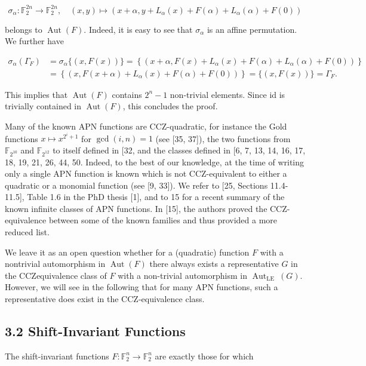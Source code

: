 \documentclass[10pt]{article}
\begin{document}
$$
\sigma_{\alpha}: \mathbb{F}_{2}^{2 n} \rightarrow \mathbb{F}_{2}^{2 n}, \quad(x, y) \mapsto\left(x+\alpha, y+L_{\alpha}(x)+F(\alpha)+L_{\alpha}(\alpha)+F(0)\right)
$$

belongs to $\operatorname{Aut}(F)$. Indeed, it is easy to see that $\sigma_{\alpha}$ is an affine permutation. We further have

$$
\begin{aligned}
\sigma_{\alpha}\left(\Gamma_{F}\right) & =\sigma_{\alpha}\{(x, F(x))\}=\left\{\left(x+\alpha, F(x)+L_{\alpha}(x)+F(\alpha)+L_{\alpha}(\alpha)+F(0)\right)\right\} \\
& =\left\{\left(x, F(x+\alpha)+L_{\alpha}(x)+F(\alpha)+F(0)\right)\right\}=\{(x, F(x))\}=\Gamma_{F} .
\end{aligned}
$$

This implies that $\operatorname{Aut}(F)$ contains $2^{n}-1$ non-trivial elements. Since id is trivially contained in $\operatorname{Aut}(F)$, this concludes the proof.

Many of the known APN functions are CCZ-quadratic, for instance the Gold functions $x \mapsto x^{2^{i}+1}$ for $\operatorname{gcd}(i, n)=1$ (see [35, 37]), the two functions from $\mathbb{F}_{2^{10}}$ and $\mathbb{F}_{2^{12}}$ to itself defined in [32, and the classes defined in [6, 7, 13, 14, 16, 17, 18, 19, 21, 26, 44, 50. Indeed, to the best of our knowledge, at the time of writing only a single APN function is known which is not CCZ-equivalent to either a quadratic or a monomial function (see [9, 33]). We refer to [25, Sections 11.4-11.5], Table 1.6 in the PhD thesis [1], and to 15 for a recent summary of the known infinite classes of APN functions. In [15], the authors proved the CCZ-equivalence between some of the known families and thus provided a more reduced list.

We leave it as an open question whether for a (quadratic) function $F$ with a nontrivial automorphism in $\operatorname{Aut}(F)$ there always exists a representative $G$ in the CCZequivalence class of $F$ with a non-trivial automorphism in $\operatorname{Aut}_{\text {LE }}(G)$. However, we will see in the following that for many APN functions, such a representative does exist in the CCZ-equivalence class.

\subsection*{3.2 Shift-Invariant Functions}
The shift-invariant functions $F: \mathbb{F}_{2}^{n} \rightarrow \mathbb{F}_{2}^{n}$ are exactly those for which
\end{document}
